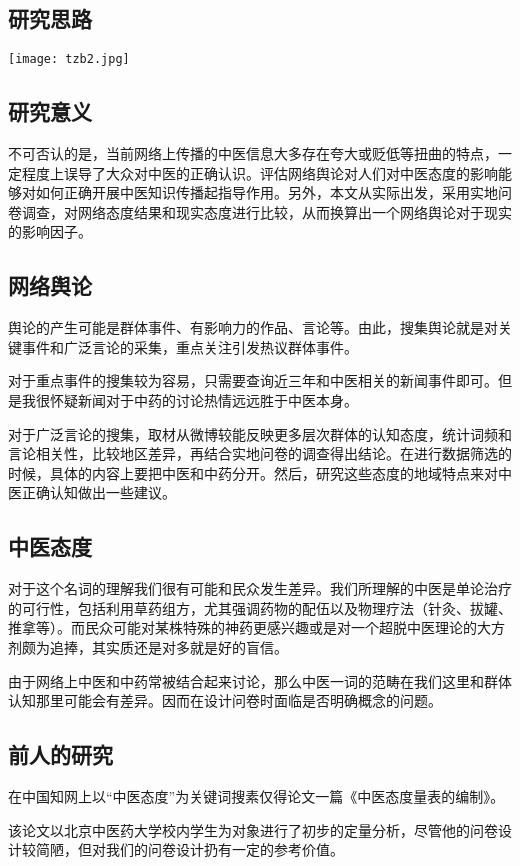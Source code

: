 \documentclass{ctexart}
\begin{document}
\subsection{研究思路}
\texttt{[image: tzb2.jpg]}

\subsection{研究意义}
不可否认的是，当前网络上传播的中医信息大多存在夸大或贬低等扭曲的特点，一定程度上误导了大众对中医的正确认识。评估网络舆论对人们对中医态度的影响能够对如何正确开展中医知识传播起指导作用。另外，本文从实际出发，采用实地问卷调查，对网络态度结果和现实态度进行比较，从而换算出一个网络舆论对于现实的影响因子。


\subsection{网络舆论}
舆论的产生可能是群体事件、有影响力的作品、言论等。由此，搜集舆论就是对关键事件和广泛言论的采集，重点关注引发热议群体事件。

对于重点事件的搜集较为容易，只需要查询近三年和中医相关的新闻事件即可。但是我很怀疑新闻对于中药的讨论热情远远胜于中医本身。

对于广泛言论的搜集，取材从微博较能反映更多层次群体的认知态度，统计词频和言论相关性，比较地区差异，再结合实地问卷的调查得出结论。在进行数据筛选的时候，具体的内容上要把中医和中药分开。然后，研究这些态度的地域特点来对中医正确认知做出一些建议。

\subsection{中医态度}
对于这个名词的理解我们很有可能和民众发生差异。我们所理解的中医是单论治疗的可行性，包括利用草药组方，尤其强调药物的配伍以及物理疗法（针灸、拔罐、推拿等）。而民众可能对某株特殊的神药更感兴趣或是对一个超脱中医理论的大方剂颇为追捧，其实质还是对多就是好的盲信。
	
由于网络上中医和中药常被结合起来讨论，那么中医一词的范畴在我们这里和群体认知那里可能会有差异。因而在设计问卷时面临是否明确概念的问题。

\subsection{前人的研究}
在中国知网上以“中医态度”为关键词搜素仅得论文一篇《中医态度量表的编制》\cite{wcy2011}。

该论文以北京中医药大学校内学生为对象进行了初步的定量分析，尽管他的问卷设计较简陋，但对我们的问卷设计扔有一定的参考价值。
\end{document}
